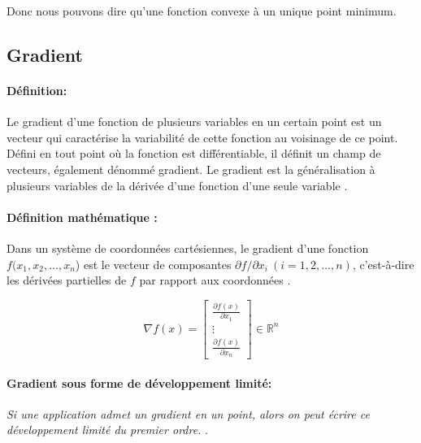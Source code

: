 		
		Donc nous pouvons dire qu'une fonction convexe à un unique point minimum.
		
		
		
		
		
		\subsection{\textbf{Gradient}}\label{sec:gradient}
		\paragraph*{Définition:}Le gradient d'une fonction de plusieurs variables en un certain point est un vecteur qui caractérise la variabilité de cette fonction au voisinage de ce point. Défini en tout point où la fonction est différentiable, il définit un champ de vecteurs, également dénommé gradient. Le gradient est la généralisation à plusieurs variables de la dérivée d'une fonction d'une seule variable \cite{benner2015numerical, bierlaire2006introduction}.%
		\paragraph*{Définition mathématique :} Dans un système de coordonnées cartésiennes, le gradient d'une fonction {$ f(x_{1},x_{2},\dots ,x_{n}$)} est le vecteur de composantes {$ \partial f/ \partial x_{i}\ (i=1,2,\dots ,n)$}, c'est-à-dire les dérivées partielles de $f$ par rapport aux coordonnées \cite{jtshiman:2021}.
		
		\begin{equation}
			{\nabla f(x)={
					\begin{bmatrix}
					{\frac {\partial f(x)}{\partial x_{1}}}\\
					\vdots \\
					{\frac {\partial f(x)}{\partial x_{n}}}
					\end{bmatrix}}} \in \mathbb{R}^n 
		\end{equation}
		
		\paragraph*{Gradient sous forme de développement limité:}
		\textit{Si une application admet un gradient en un point, alors on peut écrire ce développement limité du premier ordre. %
		}.
		
